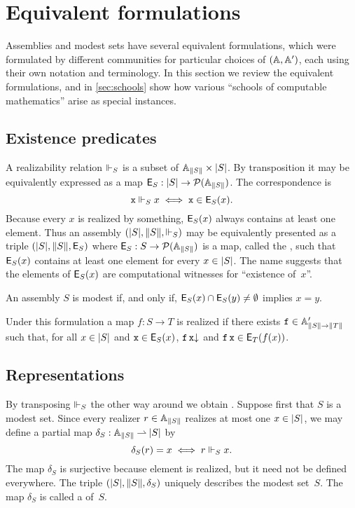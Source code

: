 \section{Equivalent formulations}
\label{sec:equivalent-formulations}

Assemblies and modest sets have several equivalent formulations, which were formulated by different communities for particular choices of $(\AA, \subAA)$, each using their own notation and terminology. In this section we review the equivalent formulations, and in \cref{sec:schools} show how various ``schools of computable mathematics'' arise as special instances.

\subsection{Existence predicates}
\label{sec:existence-predicates}

A realizability relation $\rz[S]$ is a subset of $\xAtyp{S} \times \S{S}$. By transposition it may be equivalently expressed
as a map $\Ex{S} : \S{S} \to \pow{\xAtyp{S}}$. The correspondence is
%
\begin{equation*}
  \R{x} \rz[S] x \iff \R{x} \in \Ex{S}(x).
\end{equation*}
%
Because every $x$ is realized by something, $\Ex{S}(x)$ always contains at least one element. Thus an assembly $\xasm{S}$ may be equivalently presented as a triple $(\S{S}, \T{S}, \Ex{S})$ where $\Ex{S} : S \to \pow{\xAtyp{S}}$ is a map, called the , such that $\Ex{S}(x)$ contains at least one element for every $x \in \S{S}$. The name suggests that the elements of $\Ex{S}(x)$ are computational witnesses for ``existence of~$x$''.

An assembly $S$ is modest if, and only if, $\Ex{S}(x) \cap \Ex{S}(y) \neq \emptyset$ implies $x = y$.

Under this formulation a map $f : S \to T$ is realized if there exists $\R{f} \in \subAtyp{\T{S} \to \T{T}}$ such that, for all $x \in \S{S}$ and $\R{x} \in \Ex{S}(x)$, $\defined{\R{f}\,\R{x}}$ and $\R{f}\,\R{x} \in \Ex{T}(f(x))$.

\subsection{Representations}
\label{sec:representations}

By transposing $\rz[S]$ the other way around we obtain . Suppose first that $S$ is a modest set. Since every realizer $r \in \xAtyp{S}$ realizes at most one $x \in \S{S}$, we may define a partial map $\delta_S : \xAtyp{S} \parto \S{S}$ by
%
\begin{equation*}
  \delta_S(r) = x \iff r \rz[S] x.
\end{equation*}
%
The map $\delta_S$ is surjective because element is realized, but it need not be defined everywhere. The triple $(\S{S}, \T{S}, \delta_S)$ uniquely describes the modest set~$S$. The map $\delta_S$ is called a  of~$S$.

